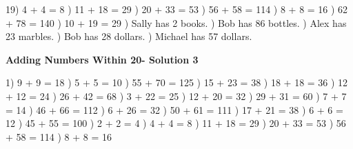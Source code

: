 \documentclass{article}%
\begin{document}
19) 4 + 4 = 8%
) 11 + 18 = 29%
) 20 + 33 = 53%
) 56 + 58 = 114%
) 8 + 8 = 16%
) 62 + 78 = 140%
) 10 + 19 = 29%
) Sally has 2 books.%
) Bob has 86 bottles.%
) Alex has 23 marbles.%
) Bob has 28 dollars.%
) Michael has 57 dollars.%
\newline%
\newpage%
\large%
\begin{center}%
\textbf{Adding Numbers Within 20- Solution 3}%
\newline%
\end{center} \normalsize%
1) 9 + 9 = 18%
) 5 + 5 = 10%
) 55 + 70 = 125%
) 15 + 23 = 38%
) 18 + 18 = 36%
) 12 + 12 = 24%
) 26 + 42 = 68%
) 3 + 22 = 25%
) 12 + 20 = 32%
) 29 + 31 = 60%
) 7 + 7 = 14%
) 46 + 66 = 112%
) 6 + 26 = 32%
) 50 + 61 = 111%
) 17 + 21 = 38%
) 6 + 6 = 12%
) 45 + 55 = 100%
) 2 + 2 = 4%
) 4 + 4 = 8%
) 11 + 18 = 29%
) 20 + 33 = 53%
) 56 + 58 = 114%
) 8 + 8 = 16%
\newline%
\end{document}
